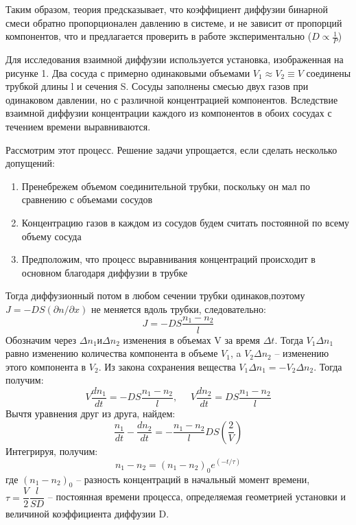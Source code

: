 \documentclass[a4paper,12pt]{article} %
\begin{document}
Таким образом, теория предсказывает, что коэффициент диффузии бинарной смеси обратно пропорционален давлению в системе, и не зависит от пропорций компонентов, что и предлагается проверить в работе экспериментально ($D\propto\frac{1}{P}$)

Для исследования взаимной диффузии используется установка, изображенная на рисунке 1. Два сосуда с примерно одинаковыми объемами $V_1 \approx V_2 \equiv V$ соединены трубкой длины l и сечения S. Сосуды заполнены смесью двух газов при одинаковом давлении, но с различной концентрацией компонентов. Вследствие взаимной диффузии концентрации каждого из компонентов в обоих сосудах с течением времени выравниваются. 

Рассмотрим этот процесс. Решение задачи упрощается, если сделать несколько допущений:
\begin{enumerate}
\itemsep0em
\item Пренебрежем объемом соединительной трубки, поскольку он мал по сравнению с объемами сосудов
\item Концентрацию газов в каждом из сосудов будем считать постоянной по всему объему сосуда
\item Предположим, что процесс выравнивания концентраций происходит в основном благодаря диффузии в трубке
\end{enumerate}
Тогда диффузионный потом в любом сечении трубки одинаков,поэтому $J = -DS(\partial n/ \partial x)$ не меняется вдоль трубки, следовательно:
\begin{equation}
J = -DS\frac{n_1 - n_2}{l}
\end{equation}
Обозначим через $\Delta n_1 \text{и} \Delta n_2$ изменения в объемах V за время $\Delta t$. Тогда $V_1\Delta n_1$ равно изменению количества компонента в объеме $V_1$, a $V_2\Delta n_2$ -- изменению этого компонента в $V_2$. Из закона сохранения вещества $V_1\Delta n_1 = -V_2\Delta n_2$. Тогда получим:
\begin{equation}
V\frac{dn_1}{dt} = -DS\frac{n_1 - n_2}{l}, \;\;\;\;\ V\frac{dn_2}{dt} = DS\frac{n_1 - n_2}{l}
\end{equation}
Вычтя уравнения друг из друга, найдем:
\begin{equation}
\frac{n_1}{dt} - \frac{dn_2}{dt} = -\frac{n_1 - n_2}{l}DS(\frac{2}{V})
\end{equation}
Интегрируя, получим:
\begin{equation}
n_1 - n_2 = (n_1 - n_2)_0 e^{(-t/\tau)}
\end{equation}
где $(n_1 - n_2)_0$ -- разность концентраций в начальный момент времени, $\tau = \dfrac{V}{2}\dfrac{l}{SD}$ -- постоянная времени процесса, определяемая геометрией установки и величиной коэффициента диффузии D.
\end{document}
